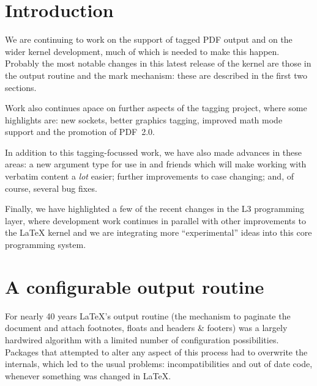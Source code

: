 \documentclass{ltnews}
\begin{document}
\maketitle
{  \spaceskip=3.33pt 
\tableofcontents}

\setlength{}

\medskip

\section{Introduction}

We are continuing to work on the support of tagged PDF output and on
the wider kernel development, much of which is needed to make this
happen.  Probably the most notable changes in this latest release of
the kernel are those in the output routine and the mark mechanism:
these are described in the first two sections.

Work also continues apace on further aspects of the tagging project,
where some highlights are: new sockets, better graphics tagging,
improved math mode support and the promotion of PDF~2.0.

In addition to this tagging-focussed work, we have also made advances
in these areas: a new argument type for use in
 and friends which will make working with
verbatim content a \emph{lot} easier; further improvements to case
changing; and, of course, several bug fixes.

Finally, we have highlighted a few of the recent changes in the L3
programming layer, where development work continues in parallel with
other improvements to the \LaTeX{} kernel and we are integrating more
\enquote{experimental} ideas into this core programming system.



\section{A configurable output routine}

For nearly 40 years \LaTeX's output routine (the mechanism to paginate
the document and attach footnotes, floats and headers \& footers) was
a largely hardwired algorithm with a limited number of configuration
possibilities.  Packages that attempted to alter any aspect of this
process had to overwrite the internals, which led to the usual
problems: incompatibilities and out of date code, whenever something
was changed in \LaTeX{}.
\end{document}
